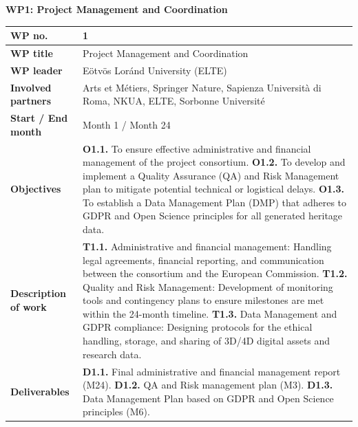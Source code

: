 \textbf{WP1: Project Management and Coordination}
\begin{table}[H]
\centering
\small
\renewcommand{\arraystretch}{1.2}
\begin{tabularx}{\textwidth}{|l|X|}
\hline
\rowcolor{gray!10} \textbf{WP no.} & 1 \\ \hline
\textbf{WP title} & Project Management and Coordination \\ \hline
\textbf{WP leader} & Eötvös Loránd University (ELTE) \\ \hline
\textbf{Involved partners} & Arts et Métiers, Springer Nature, Sapienza Università di Roma, NKUA, ELTE, Sorbonne Université \\ \hline
\textbf{Start / End month} & Month 1 / Month 24 \\ \hline
\textbf{Objectives} & \textbf{O1.1.} To ensure effective administrative and financial management of the project consortium. \newline \textbf{O1.2.} To develop and implement a Quality Assurance (QA) and Risk Management plan to mitigate potential technical or logistical delays. \newline \textbf{O1.3.} To establish a Data Management Plan (DMP) that adheres to GDPR and Open Science principles for all generated heritage data. \\ \hline
\textbf{Description of work} & \textbf{T1.1.} Administrative and financial management: Handling legal agreements, financial reporting, and communication between the consortium and the European Commission. \newline \textbf{T1.2.} Quality and Risk Management: Development of monitoring tools and contingency plans to ensure milestones are met within the 24-month timeline. \newline \textbf{T1.3.} Data Management and GDPR compliance: Designing protocols for the ethical handling, storage, and sharing of 3D/4D digital assets and research data. \\ \hline
\textbf{Deliverables} & \textbf{D1.1.} Final administrative and financial management report (M24). \newline \textbf{D1.2.} QA and Risk management plan (M3). \newline \textbf{D1.3.} Data Management Plan based on GDPR and Open Science principles (M6). \\ \hline
\end{tabularx}
\end{table}